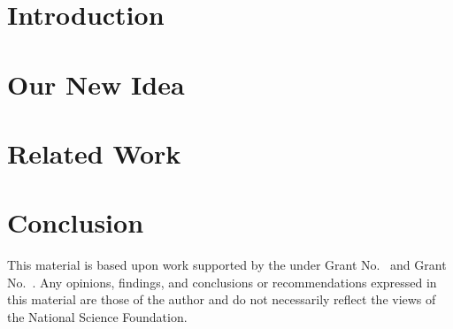 \documentclass[review, anonymous, acmsmall]{acmart}
\begin{document}

\fi

\maketitle

\section{Introduction}

\section{Our New Idea}

\section{Related Work}

\section{Conclusion}

\begin{acks}                            %
  This material is based upon work supported by the
   under Grant
  No.~ and Grant
  No.~.  Any opinions, findings, and
  conclusions or recommendations expressed in this material are those
  of the author and do not necessarily reflect the views of the
  National Science Foundation.
\end{acks}


\end{document}
